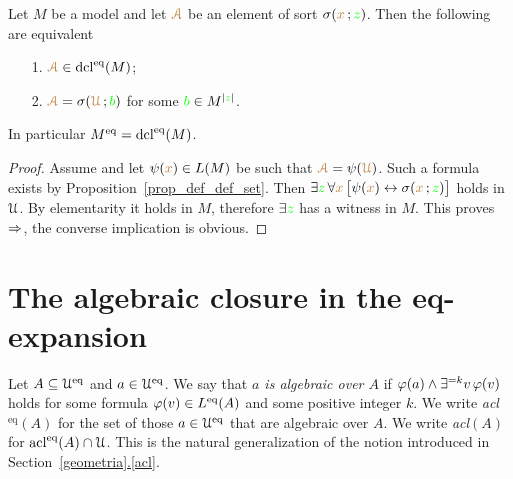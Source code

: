 \documentclass[creche.tex]{subfiles}
\begin{document}
\begin{proposition}\label{prop_standard_def_set}
Let $M$ be a model and let ${\color{brown}\EuScript A}$ be an element of sort $\sigma({\color{brown} x}\,;{\color{green} z})$.
Then the following are equivalent
\begin{itemize}
\item[1.]  ${\color{brown}\EuScript A}\in\mathop{\rm dcl}^{{\rm eq}}(M)$; 
\item[2.]  ${\color{brown}\EuScript A}=\sigma({\color{brown}\EuScript U}\,;{\color{green} b})$ for some ${\color{green} b}\in M^{|{\color{green} z}|}$.
\end{itemize}
In particular $M^{{\rm eq}}=\mathop{\rm dcl}^{{\rm eq}}(M)$.
\end{proposition}

\begin{proof}
Assume  and let $\psi({\color{brown} x})\in L(M)$ be such that ${\color{brown}\EuScript A}=\psi({\color{brown}\EuScript U})$.
Such a formula exists by Proposition~\ref{prop_def_def_set}.
Then $\exists{\color{green}z}\,\forall{\color{brown}x}\,\big[\psi({\color{brown} x})\leftrightarrow\sigma({\color{brown} x}\,;{\color{green} z})\big]$ holds in $\EuScript U$.
By elementarity it holds in $M$, therefore $\exists{\color{green}z}$ has a witness in $M$.
This proves $\Rightarrow$, the converse implication is obvious.
\end{proof}

\section{The algebraic closure in the eq-expansion}

Let $A\subseteq\EuScript U^{{\rm eq}}$ and $a\in\EuScript U^{{\rm eq}}$.
We say that \emph{$a$ is algebraic over $A$\/} if $\varphi(a)\wedge\exists^{=k}v\,\varphi(v)$ holds for some formula $\varphi(v)\in L^{{\rm eq}}(A)$ and some positive integer $k$.
We write \emph{acl$^\textrm{eq}(A)$\/} for the set of those $a\in\EuScript U^{{\rm eq}}$ that are algebraic over $A$.
We write \emph{acl$(A)$\/} for $\mathop{\rm acl}^{{\rm eq}}(A)\cap\EuScript U$.
This is the natural generalization of the notion introduced in Section~\hyperref[acl]{\ref*{geometria}.\ref*{acl}}.

\end{document}
